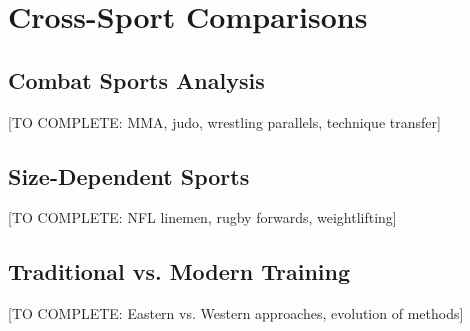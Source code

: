 \section{Cross-Sport Comparisons}

\subsection{Combat Sports Analysis}

[TO COMPLETE: MMA, judo, wrestling parallels, technique transfer]

\subsection{Size-Dependent Sports}

[TO COMPLETE: NFL linemen, rugby forwards, weightlifting]

\subsection{Traditional vs. Modern Training}

[TO COMPLETE: Eastern vs. Western approaches, evolution of methods]
